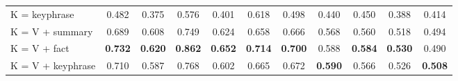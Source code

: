 \begin{table}[t]
{\begin{tabular}{l|cc cc | cc  cc  cc}
K = keyphrase & 0.482 & 0.375 & 0.576 & 0.401 & 0.618 & 0.498 & 0.440 & 0.450 & 0.388 & 0.414 \\
\hdashline
K = V + summary  & 0.689 & 0.608 & 0.749 & 0.624 & 0.658 & 0.666 & 0.568 & 0.560 & 0.518 & 0.494 \\
K = V + fact  & \textbf{0.732} & \textbf{0.620} & \textbf{0.862} & \textbf{0.652} & \textbf{0.714} & \textbf{0.700} & 0.588 & \textbf{0.584} & \textbf{0.530} & 0.490 \\
K = V + keyphrase  & 0.710 & 0.587 & 0.768 & 0.602 & 0.665 & 0.672 & \textbf{0.590} & 0.566 & 0.526 & \textbf{0.508} \\
\hline
\end{tabular}
}
\vspace{-4mm}
\label{tab:main-results-key}
\end{table}
